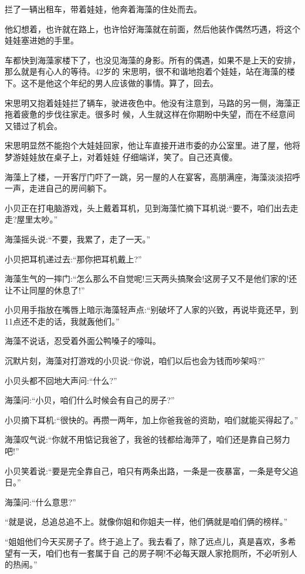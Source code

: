 \documentclass[11pt,a4paper,onecolumn]{article}
\begin{document}
拦了一辆出租车，带着娃娃，他奔着海藻的住处而去。

他幻想着，也许就在路上，也许恰好海藻就在前面，然后他装作偶然巧遇，将这个娃娃塞进她的手里。

车都快到海藻家楼下了，也没见海藻的身影。所有的偶遇，如果不是上天的安排，那么就是有心人的等待。42岁的
宋思明，很不和谐地抱着个娃娃，站在海藻的楼下。这不是他这个年纪的男人应该做的事情。算了，回去。

宋思明又抱着娃娃拦了辆车，驶进夜色中。他没有注意到，马路的另一侧，海藻正拖着疲惫的步伐往家走。很多时
候，人生就这样在你期盼中失望，而在不经意间又错过了机会。

宋思明显然不能抱个大娃娃回家，他让车直接开进市委的办公室里。进了屋，他将梦游娃娃放在桌子上，对着娃娃
仔细端详，笑了。自己还真傻。

海藻上了楼，一开客厅门吓了一跳，另一屋的人在宴客，高朋满座，海藻淡淡招呼一声，走进自己的房间躺下。

小贝正在打电脑游戏，头上戴着耳机，见到海藻忙摘下耳机说:``要不，咱们出去走走?屋里太吵。''

海藻摇头说:``不要，我累了，走了一天。''

小贝把耳机递过去:``那你把耳机戴上?''

海藻生气的一摔门:``怎么那么不自觉呢!三天两头搞聚会!这房子又不是他们家的!还让不让同屋的休息了!''

小贝用手指放在嘴唇上暗示海藻轻声点:``别破坏了人家的兴致，再说毕竟还早，到11点还不走的话，我就轰他们。''

海藻不说话，忍受着外面公鸭嗓子的嚎叫。

沉默片刻，海藻对打游戏的小贝说:``你说，咱们以后也会为钱而吵架吗?''

小贝头都不回地大声问:``什么?''

海藻问:``小贝，咱们什么时候会有自己的房子?''

小贝摘下耳机:``很快的。再攒一两年，加上你爸我爸的资助，咱们就能买得起了。''

海藻叹气说:``你就不用惦记我爸了，我爸的钱都给海萍了，咱们还是靠自己努力吧!''

小贝笑着说:``要是完全靠自己，咱只有两条出路，一条是一夜暴富，一条是夸父追日。''

海藻问:``什么意思?''

``就是说，总追总追不上。就像你姐和你姐夫一样，他们俩就是咱们俩的榜样。''

``姐姐他们今天买房子了。终于追上了。我去看了，除了远点儿，真是喜欢，多希望有一天，咱们也有一套属于自
己的房子啊!不必每天跟人家抢厕所，不必听别人的热闹。''
\end{document}
